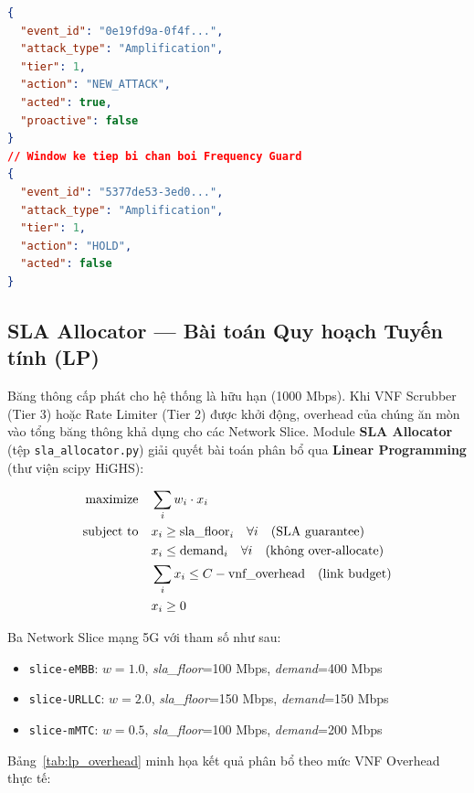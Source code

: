 \documentclass[12pt,a4paper]{article}
\begin{document}
\begin{lstlisting}[language=json,caption={JSON Log Payload Cảnh báo Proactive với Policy Guard HOLD}]
{
  "event_id": "0e19fd9a-0f4f...",
  "attack_type": "Amplification",
  "tier": 1,
  "action": "NEW_ATTACK",
  "acted": true,
  "proactive": false
}
// Window ke tiep bi chan boi Frequency Guard
{
  "event_id": "5377de53-3ed0...",
  "attack_type": "Amplification",
  "tier": 1,
  "action": "HOLD",
  "acted": false
}
\end{lstlisting}

\subsection{SLA Allocator --- Bài toán Quy hoạch Tuyến tính (LP)}

Băng thông cấp phát cho hệ thống là hữu hạn (1000 Mbps). Khi VNF Scrubber (Tier 3) hoặc Rate Limiter (Tier 2) được khởi động, overhead của chúng ăn mòn vào tổng băng thông khả dụng cho các Network Slice. Module \textbf{SLA Allocator} (tệp \texttt{sla\_allocator.py}) giải quyết bài toán phân bổ qua \textbf{Linear Programming} (thư viện scipy HiGHS):

\begin{align}
\text{maximize} \quad & \sum_{i} w_i \cdot x_i \notag \\
\text{subject to} \quad & x_i \geq \text{sla\_floor}_i \quad \forall i \quad \text{(SLA guarantee)} \notag \\
& x_i \leq \text{demand}_i \quad \forall i \quad \text{(không over-allocate)} \notag \\
& \sum_{i} x_i \leq C - \text{vnf\_overhead} \quad \text{(link budget)} \notag \\
& x_i \geq 0 \notag
\end{align}

Ba Network Slice mạng 5G với tham số như sau:
\begin{itemize}
    \item \texttt{slice-eMBB}: $w=1.0$, \textit{sla\_floor}=100 Mbps, \textit{demand}=400 Mbps
    \item \texttt{slice-URLLC}: $w=2.0$, \textit{sla\_floor}=150 Mbps, \textit{demand}=150 Mbps
    \item \texttt{slice-mMTC}: $w=0.5$, \textit{sla\_floor}=100 Mbps, \textit{demand}=200 Mbps
\end{itemize}

Bảng~\ref{tab:lp_overhead} minh họa kết quả phân bổ theo mức VNF Overhead thực tế:
\end{document}
